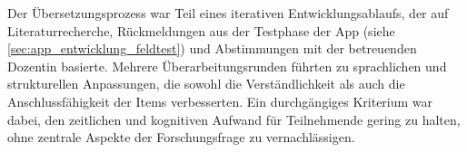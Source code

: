 Der Übersetzungsprozess war Teil eines iterativen Entwicklungsablaufs, der auf Literaturrecherche, Rückmeldungen aus der Testphase der App (siehe \cref{sec:app_entwicklung_feldtest}) und Abstimmungen mit der betreuenden Dozentin basierte. Mehrere Überarbeitungsrunden führten zu sprachlichen und strukturellen Anpassungen, die sowohl die Verständlichkeit als auch die Anschlussfähigkeit der Items verbesserten. Ein durchgängiges Kriterium war dabei, den zeitlichen und kognitiven Aufwand für Teilnehmende gering zu halten, ohne zentrale Aspekte der Forschungsfrage zu vernachlässigen.

